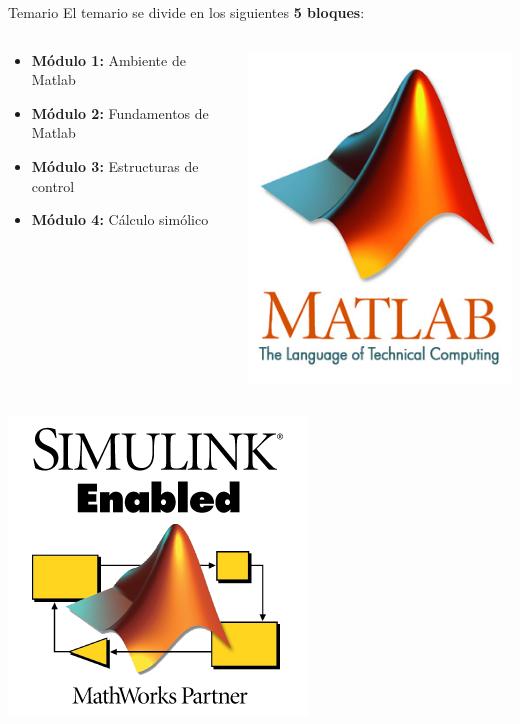 \documentclass{bredelebeamer}
\begin{document}
\begin{frame}{Temario}
El temario se divide en los siguientes \textbf{5 bloques}:
\begin{columns}
\begin{column}{0.5\textwidth}
\begin{itemize}
\item \textbf{Módulo 1:} Ambiente de Matlab 
\item \textbf{Módulo 2:} Fundamentos de Matlab 
\item \textbf{Módulo 3:} Estructuras de control
\item \textbf{Módulo 4:} Cálculo simólico
\end{itemize}
\end{column}
\begin{column}{0.3\textwidth}
\begin{center}
\includegraphics[scale=0.25]{images/matlab.jpg}
\end{center}
\end{column}
\end{columns}
\begin{columns}
\begin{column}{0.3\textwidth}
\begin{center}
\includegraphics[scale=0.3]{images/img41.png}

\end{center}
\end{column}
\end{columns}
\end{frame}
\end{document}
